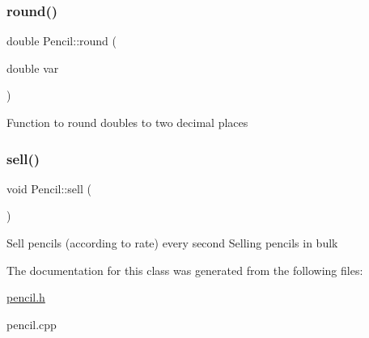 \subsubsection{\texorpdfstring{round()}{round()}}
{\footnotesize\ttfamily double Pencil\+::round (\begin{DoxyParamCaption}\item[{double}]{var }\end{DoxyParamCaption})}

Function to round doubles to two decimal places \mbox{\label{classPencil_a2731dadbd64edeee0a1cc773a79eee24}} 
\subsubsection{\texorpdfstring{sell()}{sell()}}
{\footnotesize\ttfamily void Pencil\+::sell (\begin{DoxyParamCaption}{ }\end{DoxyParamCaption})}

Sell pencils (according to rate) every second Selling pencils in bulk 

The documentation for this class was generated from the following files\+:\begin{DoxyCompactItemize}
\item 
\hyperlink{pencil_8h}{pencil.\+h}\item 
pencil.\+cpp\end{DoxyCompactItemize}
